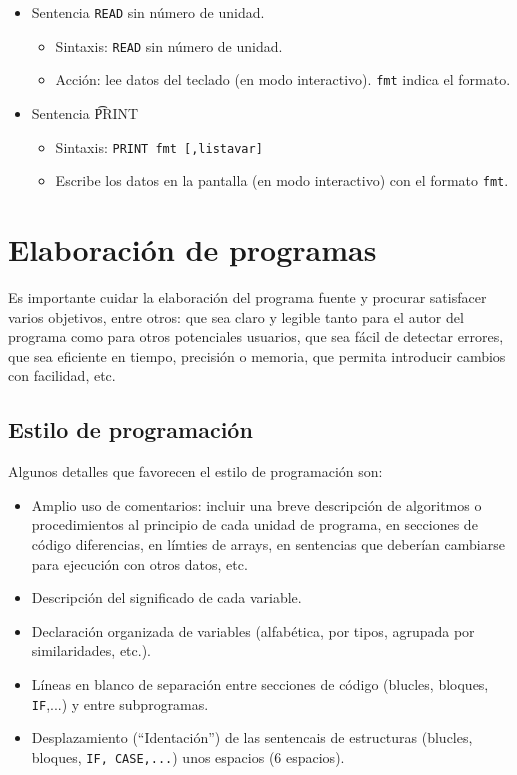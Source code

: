 \begin{itemize}
	\item Sentencia {\tt READ} sin número de unidad.
	\begin{itemize}
		\item Sintaxis: {\tt READ} sin número de unidad.
		\item Acción: lee datos del teclado (en modo interactivo). {\tt fmt} indica el formato.
	\end{itemize}
	\item Sentencia {\t PRINT}
	\begin{itemize}
		\item Sintaxis: {\tt PRINT fmt [,listavar]}
		\item Escribe los datos en la pantalla (en modo interactivo) con el formato {\tt fmt}.
	\end{itemize}
\end{itemize}

\section{Elaboración de programas}

Es importante cuidar la elaboración del programa fuente y procurar satisfacer varios objetivos, entre otros: que sea claro y legible tanto para el autor del programa como para otros potenciales usuarios, que sea fácil de detectar errores, que sea eficiente en tiempo, precisión o memoria, que permita introducir cambios con facilidad, etc.

\subsection{Estilo de programación}

Algunos detalles que favorecen el estilo de programación son:

\begin{itemize}
	\item Amplio uso de comentarios: incluir una breve descripción de algoritmos o procedimientos al principio de cada unidad de programa, en secciones de código diferencias, en límties de arrays, en sentencias que deberían cambiarse para ejecución con otros datos, etc.
	\item Descripción del significado de cada variable.
	\item Declaración organizada de variables (alfabética, por tipos, agrupada por similaridades, etc.).
	\item Líneas en blanco de separación entre secciones de código (blucles, bloques, {\tt IF},...) y entre subprogramas.
	\item Desplazamiento (``Identación'') de las sentencais de estructuras (blucles, bloques, {\tt IF, CASE,...}) unos espacios (6 espacios).

\end{itemize}
